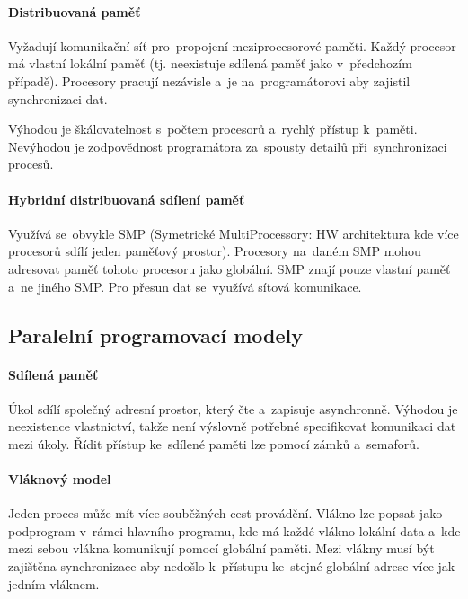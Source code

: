 \paragraph{Distribuovaná paměť}

Vyžadují komunikační síť pro~propojení meziprocesorové paměti. Každý procesor má vlastní lokální paměť (tj. neexistuje sdílená paměť jako v~předchozím případě). Procesory pracují nezávisle a~je na~programátorovi aby zajistil synchronizaci dat.

Výhodou je škálovatelnost s~počtem procesorů a~rychlý přístup k~paměti. Nevýhodou je zodpovědnost programátora za~spousty detailů při~synchronizaci procesů.

\paragraph{Hybridní distribuovaná sdílení paměť}

Využívá se~obvykle SMP (Symetrické MultiProcessory: HW architektura kde více procesorů sdílí jeden paměťový prostor). Procesory na~daném SMP mohou adresovat paměť tohoto procesoru jako globální. SMP znají pouze vlastní paměť a~ne jiného SMP. Pro přesun dat se~využívá sítová komunikace.

\subsection{Paralelní programovací modely}

\paragraph{Sdílená paměť}

Úkol sdílí společný adresní prostor, který čte a~zapisuje asynchronně. Výhodou je neexistence vlastnictví, takže není výslovně potřebné specifikovat komunikaci dat mezi úkoly. Řídit přístup ke~sdílené paměti lze pomocí zámků a~semaforů.

\paragraph{Vláknový model}

Jeden proces může mít více souběžných cest provádění. Vlákno lze popsat jako podprogram v~rámci hlavního programu, kde má každé vlákno lokální data a~kde mezi sebou vlákna komunikují pomocí globální paměti. Mezi vlákny musí být zajištěna synchronizace aby nedošlo k~přístupu ke~stejné globální adrese více jak jedním vláknem.

